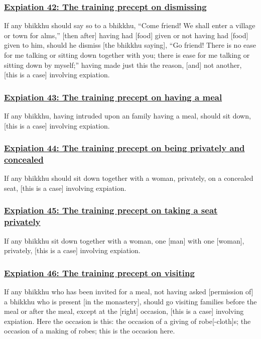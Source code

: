 \subsubsection*{\hyperref[pac42]{Expiation 42: The training precept on dismissing}}
\label{exp42}
If any bhikkhu should say so to a bhikkhu, ``Come friend! We shall enter a village or town for alms,'' [then after] having had [food] given or not having had [food] given to him, should he dismiss [the bhikkhu saying], ``Go friend! There is no ease for me talking or sitting down together with you; there is ease for me talking or sitting down by myself;'' having made just this the reason, [and] not another, [this is a case] involving expiation.



\subsubsection*{\hyperref[pac43]{Expiation 43: The training precept on having a meal}}
\label{exp43}
If any bhikkhu, having intruded upon an family having a meal, should sit down, [this is a case] involving expiation.



\subsubsection*{\hyperref[pac44]{Expiation 44: The training precept on being privately and concealed}}
\label{exp44}
If any bhikkhu should sit down together with a woman, privately, on a concealed seat, [this is a case] involving expiation.



\subsubsection*{\hyperref[pac45]{Expiation 45: The training precept on taking a seat privately}}
\label{exp45}
If any bhikkhu sit down together with a woman, one [man] with one [woman], privately, [this is a case] involving expiation.



\subsubsection*{\hyperref[pac46]{Expiation 46: The training precept on visiting}}
\label{exp46}
If any bhikkhu who has been invited for a meal, not having asked [permission of] a bhikkhu who is present [in the monastery], should go visiting families before the meal or after the meal, except at the [right] occasion, [this is a case] involving expiation. Here the occasion is this: the occasion of a giving of robe[-cloth]s; the occasion of a making of robes; this is the occasion here.



